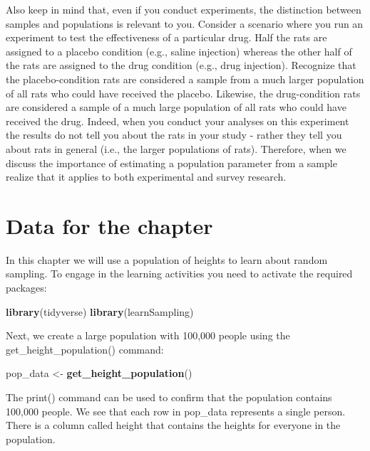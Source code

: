 \documentclass[
]{krantz}
\makeatletter
\newenvironment{Shaded}{\begin{snugshade}}{\end{snugshade}}
\newcommand{\KeywordTok}[1]{\textcolor[rgb]{0.27,0.27,0.27}{\textbf{#1}}}
\newcommand{\NormalTok}[1]{#1}
\newcommand{\StringTok}[1]{\textcolor[rgb]{0.5,0.5,0.5}{#1}}
\newenvironment{kframe}{%
\medskip{}
\setlength{\fboxsep}{.8em}
 \def\at@end@of@kframe{}%
 \ifinner\ifhmode%
  \def\at@end@of@kframe{\end{minipage}}%
  \begin{minipage}{\columnwidth}%
 \fi\fi%
 \def\FrameCommand##1{\hskip\@totalleftmargin \hskip-\fboxsep
 \colorbox{shadecolor}{##1}\hskip-\fboxsep
     \hskip-\linewidth \hskip-\@totalleftmargin \hskip\columnwidth}%
 \MakeFramed {\advance\hsize-\width
   \@totalleftmargin\z@ \linewidth\hsize
   \@setminipage}}%
 {\par\unskip\endMakeFramed%
 \at@end@of@kframe}
\renewenvironment{Shaded}{\begin{kframe}}{\end{kframe}}
\makeatother
\begin{document}
Also keep in mind that, even if you conduct experiments, the distinction between samples and populations is relevant to you. Consider a scenario where you run an experiment to test the effectiveness of a particular drug. Half the rats are assigned to a placebo condition (e.g., saline injection) whereas the other half of the rats are assigned to the drug condition (e.g., drug injection). Recognize that the placebo-condition rats are considered a sample from a much larger population of all rats who could have received the placebo. Likewise, the drug-condition rats are considered a sample of a much large population of all rats who could have received the drug. Indeed, when you conduct your analyses on this experiment the results do not tell you about the rats in your study - rather they tell you about rats in general (i.e., the larger populations of rats). Therefore, when we discuss the importance of estimating a population parameter from a sample realize that it applies to both experimental and survey research.

\hypertarget{data-for-the-chapter}{%
\section{Data for the chapter}\label{data-for-the-chapter}}

In this chapter we will use a population of heights to learn about random sampling. To engage in the learning activities you need to activate the required packages:

\begin{Shaded}
\begin{Highlighting}[]
\KeywordTok{library}\NormalTok{(tidyverse)}
\KeywordTok{library}\NormalTok{(learnSampling)}
\end{Highlighting}
\end{Shaded}

Next, we create a large population with 100,000 people using the get\_height\_population() command:

\begin{Shaded}
\begin{Highlighting}[]
\NormalTok{pop_data <-}\StringTok{ }\KeywordTok{get_height_population}\NormalTok{() }
\end{Highlighting}
\end{Shaded}

The print() command can be used to confirm that the population contains 100,000 people. We see that each row in pop\_data represents a single person. There is a column called height that contains the heights for everyone in the population.
\end{document}
